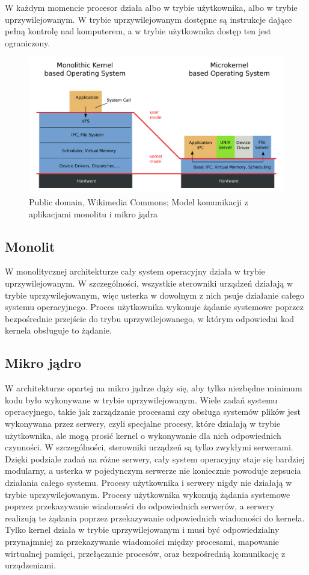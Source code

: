 W każdym momencie procesor działa albo w trybie użytkownika, albo w trybie uprzywilejowanym. W trybie uprzywilejowanym dostępne są instrukcje dające pełną kontrolę nad komputerem, a w trybie użytkownika dostęp ten jest ograniczony.

\begin{figure}[H]  
    \centering
    \includegraphics[width=12cm]{chapters/sysopy/monolit/2560px-OS-structure.svg.png}
\caption{Public domain, Wikimedia Commons; Model komunikacji z aplikacjami monolitu i mikro jądra}
\end{figure}

\subsection{Monolit}
W monolitycznej architekturze cały system operacyjny działa w trybie uprzywilejowanym. W szczególności, wszystkie sterowniki urządzeń działają w trybie uprzywilejowanym, więc usterka w dowolnym z nich psuje działanie całego systemu operacyjnego. Proces użytkownika wykonuje żądanie systemowe poprzez bezpośrednie przejście do trybu uprzywilejowanego, w którym odpowiedni kod kernela obsługuje to żądanie.

\subsection{Mikro jądro}
W architekturze opartej na mikro jądrze dąży się, aby tylko niezbędne minimum kodu było wykonywane w trybie uprzywilejowanym. Wiele zadań systemu operacyjnego, takie jak zarządzanie procesami czy obsługa systemów plików jest wykonywana przez serwery, czyli specjalne procesy, które działają w trybie użytkownika, ale mogą prosić kernel o wykonywanie dla nich odpowiednich czynności. W szczególności, sterowniki urządzeń są tylko zwykłymi serwerami. Dzięki podziale zadań na różne serwery, cały system operacyjny staje się bardziej modularny, a usterka w pojedynczym serwerze nie koniecznie powoduje zepsucia działania całego systemu. Procesy użytkownika i serwery nigdy nie działają w trybie uprzywilejowanym. Procesy użytkownika wykonują żądania systemowe poprzez przekazywanie wiadomości do odpowiednich serwerów, a serwery realizują te żądania poprzez przekazywanie odpowiednich wiadomości do kernela. Tylko kernel działa w trybie uprzywilejowanym i musi być odpowiedzialny przynajmniej za przekazywanie wiadomości między procesami, mapowanie wirtualnej pamięci, przełączanie procesów, oraz bezpośrednią komunikację z urządzeniami.

